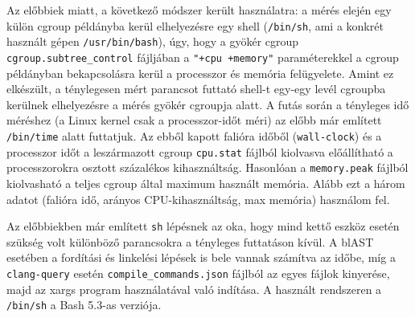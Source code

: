 Az előbbiek miatt, a következő módszer került használatra:
a mérés elején egy külön cgroup példányba kerül elhelyezésre egy shell ({\tt /bin/sh}, ami a konkrét használt gépen {\tt /usr/bin/bash}), úgy, hogy a gyökér cgroup {\tt cgroup.subtree\_control} fájljában a {\tt "+cpu +memory"} paraméterekkel a cgroup példányban bekapcsolásra kerül a processzor és memória felügyelete.
Amint ez elkészült, a ténylegesen mért parancsot futtató shell-t egy-egy levél cgroupba kerülnek elhelyezésre a mérés gyökér cgroupja alatt.
A futás során a tényleges idő méréshez (a Linux kernel csak a processzor-időt méri) az előbb már említett {\tt /bin/time} alatt futtatjuk.
Az ebből kapott falióra időből ({\tt wall-clock}) és a processzor időt a leszármazott cgroup {\tt cpu.stat} fájlból kiolvasva előállítható a processzorokra osztott százalékos kihasználtság.
Hasonlóan a {\tt memory.peak} fájlból kiolvasható a teljes cgroup által maximum használt memória.
Alább ezt a három adatot (falióra idő, arányos CPU-kihasználtság, max memória) használom fel.

Az előbbiekben már említett {\tt sh} lépésnek az oka, hogy mind kettő eszköz esetén szükség volt különböző parancsokra a tényleges futtatáson kívül.
A blAST esetében a fordítási és linkelési lépések is bele vannak számítva az időbe, míg a {\tt clang-query} esetén {\tt compile\_commands.json} fájlból az egyes fájlok kinyerése, majd az xargs program használatával való indítása.
A használt rendszeren a {\tt /bin/sh} a Bash 5.3-as verziója.

